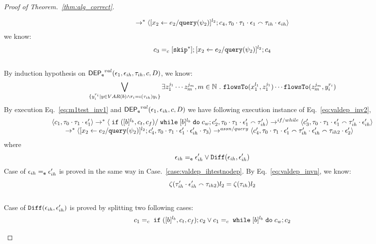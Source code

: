 \begin{proof}[Proof of Theorem.~\ref{thm:alg_correct}]
\begin{case}
\begin{subcase}
\begin{subsubcase}
\begin{subsubsubcase}
\[  \rightarrow^{*} 
  \langle [\mathrel{ {x}_2 \leftarrow e_2 / {\tt query}(\psi_2) }]^{l_2};{c}_4, 
  \mathtt{\tau}_0 \cdot \mathtt{\tau}_1 \cdot \mathtt{\epsilon}_1 \smallfrown \mathtt{\tau}_{ih} \cdot \mathtt{\epsilon}_{ih} \rangle 
 \]
 we know:
  \[
 c_3 =_c 
 [\mathtt{skip}^*]; [\mathrel{ {x}_2 \leftarrow e_2 / {\tt query}(\psi_2) }]^{l_2};{c}_4
 \]
\label{case:valdep_ihtestdep}
\\
%
By induction hypothesis on $\mathsf{DEP_{\mathtt{e}}}^{val}(\mathtt{\epsilon}_1, \mathtt{\epsilon}_{ih}, \mathtt{\tau}_{ih}, c, D)$, we know:
%
\begin{equation}
\label{eq:valdep_ihtestb}
  \bigvee_{\{y_i^{r_i} \vert y \in VAR(b) \land r_i = \iota(\mathtt{\tau}_{ih}) y_i\}}
  \exists z_1^{j_1} \cdots z_m^{j_m}, m \in \mathbb{N} ~.~ 
  \mathtt{flowsTo}(x_1^{l_1}, z_1^{j_1}) \cdots \mathtt{flowsTo}(z_m^{j_m}, y_i^{r_i})
\end{equation}
%
By execution Eq.~\ref{eq:m1test_inv1} and $\mathsf{DEP_{\mathtt{e}}}^{val}(\mathtt{\epsilon}_1, \mathtt{\epsilon}_{ih}, c, D)$ we have following execution instance of Eq.~\ref{eq:valdep_inv2},
\begin{equation}
\label{eq:m1test_inv2}
  \begin{array}{l}   
  \langle c_1, \mathtt{\tau}_0 \cdot \mathtt{\tau}_1 \cdot \mathtt{\epsilon}_1' \rangle 
  \rightarrow^{*} 
  \langle \;\mathtt{if}\; ([b]^{l_b}, c_t, c_f) / \;\mathtt{while}\; [b]^{l_b} \;\mathtt{do}\; c_w ; {c}_2', \mathtt{\tau}_0 \cdot \mathtt{\tau}_1 \cdot \mathtt{\epsilon}_1' \smallfrown \mathtt{\tau}_{ih}' \rangle 
  \rightarrow^{if / while} 
  \langle c_3', \mathtt{\tau}_0 \cdot \mathtt{\tau}_1 \cdot \mathtt{\epsilon}_1'  \smallfrown \mathtt{\tau}_{ih}' \cdot \mathtt{\epsilon}_{ih}' \rangle 
  \\
  \qquad \rightarrow^{*} 
  \langle [\mathrel{ {x}_2 \leftarrow e_2 / {\tt query}(\psi_2) }]^{l_2};{c}_4', 
  \mathtt{\tau}_0 \cdot \mathtt{\tau}_1 \cdot \mathtt{\epsilon}_1' \cdot \mathtt{\epsilon}_{ih}' \cdot \mathtt{\tau}_3 \rangle
  \rightarrow^{assn/query} 
  \langle {c}_4',  \mathtt{\tau}_0 \cdot \mathtt{\tau}_1 \cdot \mathtt{\epsilon}_1' \smallfrown \mathtt{\tau}_{ih}' \cdot \mathtt{\epsilon}_{ih}' \smallfrown \mathtt{\tau}_{ih2} \cdot \mathtt{\epsilon}_2' \rangle 
\end{array}
\end{equation}
where 
\[
  \mathtt{\epsilon}_{ih} =_{\mathtt{e}} \mathtt{\epsilon}_{ih}' \lor \mathtt{Diff}(\mathtt{\epsilon}_{ih}, \mathtt{\epsilon}_{ih}')
\]
%
Case of $\mathtt{\epsilon}_{ih} =_{\mathtt{e}} \mathtt{\epsilon}_{ih}'$ is proved in the same way in Case.~\ref{case:valdep_ihtestnodep}.
%
By Eq.~\ref{eq:valdep_invn}, we know:
%
\[
\mathtt{\zeta}(\mathtt{\tau}_{ih}' \cdot \mathtt{\epsilon}_{ih}' \smallfrown \mathtt{\tau}_{ih2}) l_2  = \mathtt{\zeta}(\mathtt{\tau}_{ih}) l_2 
 \]
%
\\
Case of $\mathtt{Diff}(\mathtt{\epsilon}_{ih}, \mathtt{\epsilon}_{ih}')$ is proved by splitting two following cases:
\[
  c_1 =_c \;\mathtt{if}\; ([b]^{l_b}, c_t, c_f);{c}_2
  \lor
  c_1 =_c \;\mathtt{while}\; [b]^{l_b} \;\mathtt{do}\; c_w;{c}_2
\]
\begin{subproof} 

\end{subproof}
\end{subsubsubcase}
\end{subsubcase}
\end{subcase}
\end{case}
\end{proof}
